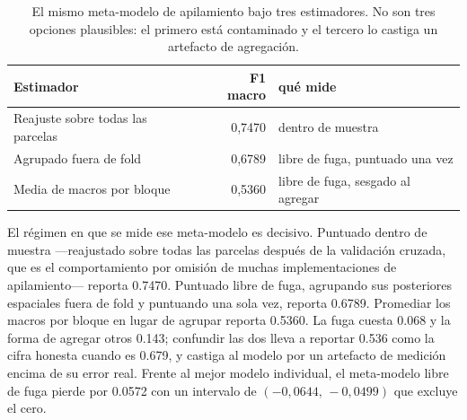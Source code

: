 \begin{table}[tbp]
\caption{El mismo meta-modelo de apilamiento bajo tres estimadores. No son tres opciones
plausibles: el primero está contaminado y el tercero lo castiga un artefacto de agregación.}
\label{tab:regimenes}
\centering
\small
\setlength{\tabcolsep}{5pt}
\begin{tabular}{lrl}
\toprule
Estimador & F1 macro & qué mide \\
\midrule
Reajuste sobre todas las parcelas & 0,7470 & dentro de muestra \\
Agrupado fuera de fold & 0,6789 & libre de fuga, puntuado una vez \\
Media de macros por bloque & 0,5360 & libre de fuga, sesgado al agregar \\
\bottomrule
\end{tabular}
\end{table}

El régimen en que se mide ese meta-modelo es decisivo. Puntuado dentro de muestra —reajustado sobre
todas las parcelas después de la validación cruzada, que es el comportamiento por omisión de muchas
implementaciones de apilamiento— reporta \num{0.7470}. Puntuado libre de fuga, agrupando sus
posteriores espaciales fuera de fold y puntuando una sola vez, reporta \num{0.6789}. Promediar los
macros por bloque en lugar de agrupar reporta \num{0.5360}. La fuga cuesta \num{0.068} y la forma
de agregar otros \num{0.143}; confundir las dos lleva a reportar \num{0.536} como la cifra honesta
cuando es \num{0.679}, y castiga al modelo por un artefacto de medición encima de su error real.
Frente al mejor modelo individual, el meta-modelo libre de fuga pierde por \num{0.0572} con un
intervalo de $(-0{,}0644,\, -0{,}0499)$ que excluye el cero.
